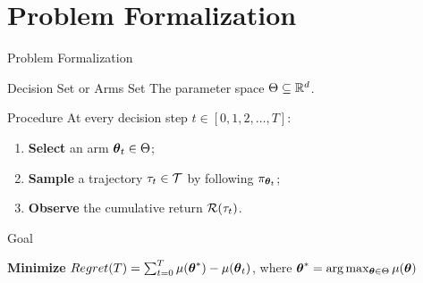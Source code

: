 \section{Problem Formalization}

\begin{frame}{Problem Formalization}

\onslide<+->\begin{block}{Decision Set or Arms Set}
The parameter space $\Theta\subseteq\mathbb{R}^d$.
\end{block}

\onslide<+->\begin{block}{Procedure}
At every decision step $t\in[0,1,2,\dots,T]$:
	\begin{enumerate}
			\item<+-|alert@+> \textbf{Select} an arm $\boldsymbol{\theta}_t\in\Theta$;
			\item<+-|alert@+> \textbf{Sample} a trajectory $\tau_t\in\mathcal{T}$ by following $\pi_{\boldsymbol{\theta}_t}$;
			\item<+-|alert@+> \textbf{Observe} the cumulative return $\mathcal{R}(\tau_t)$.
		\end{enumerate}
\end{block}

\onslide<+->\begin{block}{Goal}

\textbf{Minimize} $Regret(T) = \sum_{t=0}^{T}\mu(\boldsymbol{\theta}^*)-\mu(\boldsymbol{\theta}_t)$, where $\boldsymbol{\theta}^*=\arg\max_{\boldsymbol{\theta}\in\Theta}\mu(\boldsymbol{\theta})$
\end{block}


\end{frame}


